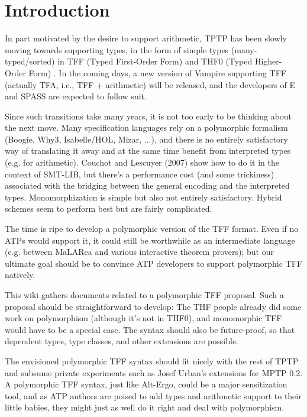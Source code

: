 \section{Introduction}
\label{sec_intro}

In part motivated by the desire to support arithmetic, TPTP has been slowly
moving towards supporting types, in the form of simple types (many-typed/sorted)
in TFF (Typed First-Order Form) \cite{TFF0} and THF0 (Typed Higher-Order Form)
\cite{xxx}. In the coming days, a new version of Vampire supporting TFF
(actually TFA, i.e., TFF + arithmetic) will be released, and the developers of E
and SPASS are expected to follow suit.

Since such transitions take many years, it is not too early to be thinking about
the next move. Many specification languages rely on a polymorphic formalism
(Boogie, Why3, Isabelle/HOL, Mizar, ...), and there is no entirely satisfactory
way of translating it away and at the same time benefit from interpreted types
(e.g. for arithmetic). Couchot and Lescuyer (2007) show how to do it in the
context of SMT-LIB, but there's a performance cost (and some trickiness)
associated with the bridging between the general encoding and the interpreted
types. Monomorphization is simple but also not entirely satisfactory. Hybrid
schemes seem to perform best but are fairly complicated.

The time is ripe to develop a polymorphic version of the TFF format. Even if no
ATPs would support it, it could still be worthwhile as an intermediate language
(e.g. between MaLARea and various interactive theorem provers); but our ultimate
goal should be to convince ATP developers to support polymorphic TFF natively.

This wiki gathers documents related to a polymorphic TFF proposal. Such a
proposal should be straightforward to develop: The THF people already did some
work on polymorphism (although it's not in THF0), and monomorphic TFF would have
to be a special case. The syntax should also be future-proof, so that dependent
types, type classes, and other extensions are possible.

The envisioned polymorphic TFF syntax should fit nicely with the rest of TPTP
and subsume private experiments such as Josef Urban's extensions for MPTP 0.2. A
polymorphic TFF syntax, just like Alt-Ergo, could be a major sensitization tool,
and as ATP authors are poised to add types and arithmetic support to their
little babies, they might just as well do it right and deal with polymorphism.

